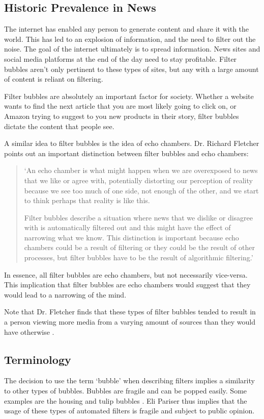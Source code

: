 \documentclass[12pt]{article}
\begin{document}
\subsection{Historic Prevalence in News}
The internet has enabled any person to generate content and share it with the
world. This has led to an explosion of information, and the need to filter out
the noise. The goal of the internet ultimately is to spread information. News
sites and social media platforms at the end of the day need to stay profitable.
Filter bubbles aren't only pertinent to these types of sites, but any with a
large amount of content is reliant on filtering.

Filter bubbles are absolutely an important factor for society. Whether a website
wants to find the next article that you are most likely going to click on, or
Amazon trying to suggest to you new products in their story, filter bubbles
dictate the content that people see.

A similar idea to filter bubbles is the idea of echo chambers. Dr. Richard
Fletcher points out an important distinction between filter bubbles and echo
chambers:

\begin{quote}
    `An echo chamber is what might happen when we are overexposed to news that
    we like or agree with, potentially distorting our perception of reality
    because we see too much of one side, not enough of the other, and we start
    to think perhaps that reality is like this.

    Filter bubbles describe a situation where news that we dislike or disagree
    with is automatically filtered out and this might have the effect of
    narrowing what we know. This distinction is important because echo chambers
    could be a result of filtering or they could be the result of other
    processes, but filter bubbles have to be the result of algorithmic
    filtering.' \cite{richard}
\end{quote}

In essence, all filter bubbles are echo chambers, but not necessarily
vice-versa. This implication that filter bubbles are echo chambers would suggest
that they would lead to a narrowing of the mind.

Note that Dr. Fletcher finds that these types of filter bubbles tended to result
in a person viewing more media from a varying amount of sources than they would
have otherwise \cite{richard}.

\subsection{Terminology}
The decision to use the term `bubble' when describing filters implies a
similarity to other types of bubbles. Bubbles are fragile and can be popped
easily. Some examples are the housing \cite{publications2006us} and tulip
bubbles \cite{dash2011tulipomania}. Eli Pariser thus implies that the usage of
these types of automated filters is fragile and subject to public opinion.
\end{document}
